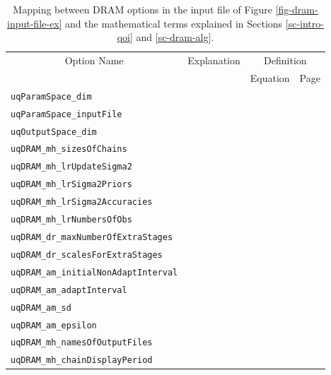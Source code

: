 \begin{table}
\begin{tabular}{|l|c|c|c|}
\hline
\multicolumn{1}{|c|}{Option Name}        & Explanation       & \multicolumn{2}{c|}{Definition} \\
\cline{3-4}
                                         &                   & Equation    & Page              \\
\hline
\verb=uqParamSpace_dim=                  &                   &             &                   \\
\hline
\verb=uqParamSpace_inputFile=            &                   &             &                   \\
\hline
\verb=uqOutputSpace_dim=                 &                   &             &                   \\
\hline
\verb=uqDRAM_mh_sizesOfChains=           &                   &             &                   \\
\hline
\verb=uqDRAM_mh_lrUpdateSigma2=          &                   &             &                   \\
\hline
\verb=uqDRAM_mh_lrSigma2Priors=          &                   &             &                   \\
\hline
\verb=uqDRAM_mh_lrSigma2Accuracies=      &                   &             &                   \\
\hline
\verb=uqDRAM_mh_lrNumbersOfObs=          &                   &             &                   \\
\hline
\verb=uqDRAM_dr_maxNumberOfExtraStages=  &                   &             &                   \\
\hline
\verb=uqDRAM_dr_scalesForExtraStages=    &                   &             &                   \\
\hline
\verb=uqDRAM_am_initialNonAdaptInterval= &                   &             &                   \\
\hline
\verb=uqDRAM_am_adaptInterval=           &                   &             &                   \\
\hline
\verb=uqDRAM_am_sd=                      &                   &             &                   \\
\hline
\verb=uqDRAM_am_epsilon=                 &                   &             &                   \\
\hline
\verb=uqDRAM_mh_namesOfOutputFiles=      &                   &             &                   \\
\hline
\verb=uqDRAM_mh_chainDisplayPeriod=      &                   &             &                   \\
\hline
\end{tabular}
\caption{Mapping between DRAM options in the input file of Figure \ref{fig-dram-input-file-ex} and the mathematical terms explained in Sections \ref{sc-intro-qoi} and \ref{sc-dram-alg}.}
\label{tab-dram-map}
\end{table}

